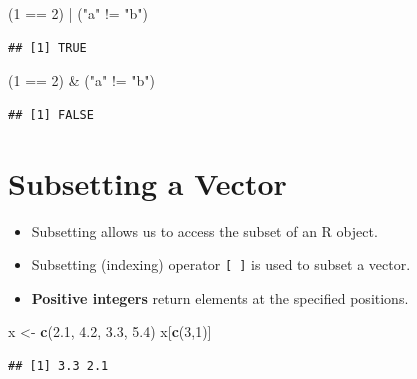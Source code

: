 \documentclass[]{book}
\newenvironment{Shaded}{\begin{snugshade}}{\end{snugshade}}
\newcommand{\KeywordTok}[1]{\textcolor[rgb]{0.13,0.29,0.53}{\textbf{{#1}}}}
\newcommand{\DecValTok}[1]{\textcolor[rgb]{0.00,0.00,0.81}{{#1}}}
\newcommand{\FloatTok}[1]{\textcolor[rgb]{0.00,0.00,0.81}{{#1}}}
\newcommand{\StringTok}[1]{\textcolor[rgb]{0.31,0.60,0.02}{{#1}}}
\newcommand{\NormalTok}[1]{{#1}}
\providecommand{\tightlist}{%
  \setlength{\itemsep}{0pt}\setlength{\parskip}{0pt}}
\begin{document}
\begin{Shaded}
\begin{Highlighting}[]
\NormalTok{(}\DecValTok{1} \NormalTok{==}\StringTok{ }\DecValTok{2}\NormalTok{) |}\StringTok{ }\NormalTok{(}\StringTok{"a"} \NormalTok{!=}\StringTok{ "b"}\NormalTok{)}
\end{Highlighting}
\end{Shaded}

\begin{verbatim}
## [1] TRUE
\end{verbatim}

\begin{Shaded}
\begin{Highlighting}[]
\NormalTok{(}\DecValTok{1} \NormalTok{==}\StringTok{ }\DecValTok{2}\NormalTok{) &}\StringTok{ }\NormalTok{(}\StringTok{"a"} \NormalTok{!=}\StringTok{ "b"}\NormalTok{)}
\end{Highlighting}
\end{Shaded}

\begin{verbatim}
## [1] FALSE
\end{verbatim}

\section{Subsetting a Vector}\label{subsetting-a-vector}

\begin{itemize}
\tightlist
\item
  Subsetting allows us to access the subset of an R object.
\item
  Subsetting (indexing) operator \texttt{{[}\ {]}} is used to subset a
  vector.
\item
  \textbf{Positive integers} return elements at the specified positions.
\end{itemize}

\begin{Shaded}
\begin{Highlighting}[]
\NormalTok{x <-}\StringTok{ }\KeywordTok{c}\NormalTok{(}\FloatTok{2.1}\NormalTok{, }\FloatTok{4.2}\NormalTok{, }\FloatTok{3.3}\NormalTok{, }\FloatTok{5.4}\NormalTok{)}
\NormalTok{x[}\KeywordTok{c}\NormalTok{(}\DecValTok{3}\NormalTok{,}\DecValTok{1}\NormalTok{)]}
\end{Highlighting}
\end{Shaded}

\begin{verbatim}
## [1] 3.3 2.1
\end{verbatim}
\end{document}
